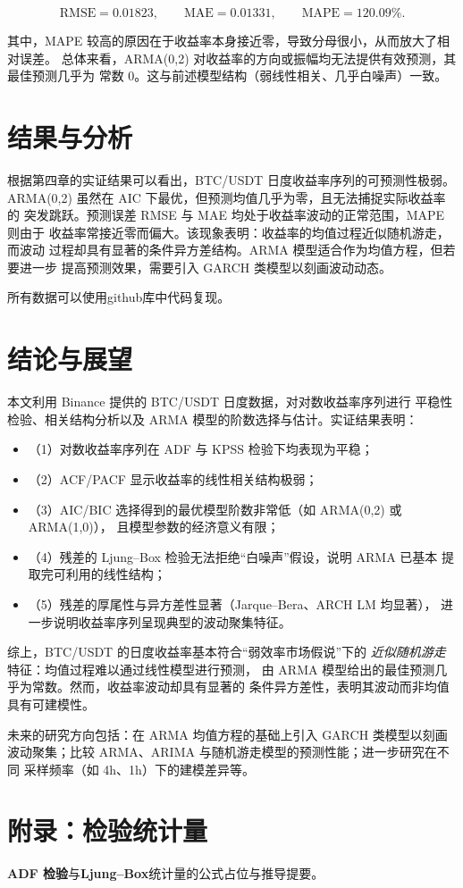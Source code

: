 \documentclass[12pt]{article}
\theoremstyle{definition}
\begin{document}
\[
    \mathrm{RMSE} = 0.01823,\qquad
    \mathrm{MAE} = 0.01331,\qquad
    \mathrm{MAPE} = 120.09\%.
\]

其中，MAPE 较高的原因在于收益率本身接近零，导致分母很小，从而放大了相对误差。
总体来看，ARMA(0,2) 对收益率的方向或振幅均无法提供有效预测，其最佳预测几乎为
常数 0。这与前述模型结构（弱线性相关、几乎白噪声）一致。

\section{结果与分析}
\label{sec:result}

根据第四章的实证结果可以看出，BTC/USDT 日度收益率序列的可预测性极弱。
ARMA(0,2) 虽然在 AIC 下最优，但预测均值几乎为零，且无法捕捉实际收益率的
突发跳跃。预测误差 RMSE 与 MAE 均处于收益率波动的正常范围，MAPE 则由于
收益率常接近零而偏大。该现象表明：收益率的均值过程近似随机游走，而波动
过程却具有显著的条件异方差结构。ARMA 模型适合作为均值方程，但若要进一步
提高预测效果，需要引入 GARCH 类模型以刻画波动动态。

所有数据可以使用github库中代码\cite{github-test}复现。

\section{结论与展望}
\label{sec:conclusion}

本文利用 Binance 提供的 BTC/USDT 日度数据，对对数收益率序列进行
平稳性检验、相关结构分析以及 ARMA 模型的阶数选择与估计。实证结果表明：

\begin{itemize}
    \item （1）对数收益率序列在 ADF 与 KPSS 检验下均表现为平稳；
    \item （2）ACF/PACF 显示收益率的线性相关结构极弱；
    \item （3）AIC/BIC 选择得到的最优模型阶数非常低（如 ARMA(0,2) 或 ARMA(1,0)），
          且模型参数的经济意义有限；
    \item （4）残差的 Ljung--Box 检验无法拒绝“白噪声”假设，说明 ARMA 已基本
          提取完可利用的线性结构；
    \item （5）残差的厚尾性与异方差性显著（Jarque--Bera、ARCH LM 均显著），
          进一步说明收益率序列呈现典型的波动聚集特征。
\end{itemize}

综上，BTC/USDT 的日度收益率基本符合“弱效率市场假说”下的
\emph{近似随机游走}特征：均值过程难以通过线性模型进行预测，
由 ARMA 模型给出的最佳预测几乎为常数。然而，收益率波动却具有显著的
条件异方差性，表明其波动而非均值具有可建模性。

未来的研究方向包括：在 ARMA 均值方程的基础上引入 GARCH 类模型以刻画
波动聚集；比较 ARMA、ARIMA 与随机游走模型的预测性能；进一步研究在不同
采样频率（如 4h、1h）下的建模差异等。

\appendix
\section{附录：检验统计量}
\label{app:stats}
\textbf{ADF 检验}与\textbf{Ljung--Box}统计量的公式占位与推导提要。


\end{document}
